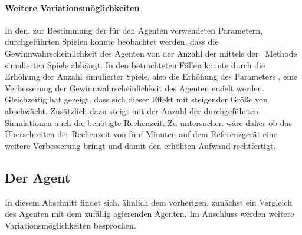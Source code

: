\paragraph{Weitere Variationsmöglichkeiten}
In den, zur Bestimmung der für den Agenten verwendeten Parametern, durchgeführten Spielen konnte beobachtet werden, dass die Gewinnwahrscheinlichkeit des Agenten von der Anzahl der mittels der \mc\ Methode simulierten Spiele abhängt. In den betrachteten Fällen konnte durch die Erhöhung der Anzahl simulierter Spiele, also die Erhöhung des Parameters , eine Verbesserung der Gewinnwahrscheinlichkeit des Agenten erzielt werden. Gleichzeitig hat \cite{nijssen_2007} gezeigt, dass sich dieser Effekt mit steigender Größe von  abschwächt. Zusätzlich dazu steigt mit der Anzahl der durchgeführten Simulationen auch die benötigte Rechenzeit. Zu untersuchen wäre daher ob das Überschreiten der Rechenzeit von fünf Minuten auf dem Referenzgerät eine weitere Verbesserung bringt und damit den erhöhten Aufwand rechtfertigt.

\subsection{Der Agent \mxZitat{\abp}}
In diesem Abschnitt findet sich, ähnlich dem vorherigen, zunächst ein Vergleich des \mxZitat{\abp} Agenten mit dem zufällig agierenden Agenten. Im Anschluss werden weitere Variationsmöglichkeiten besprochen. 
